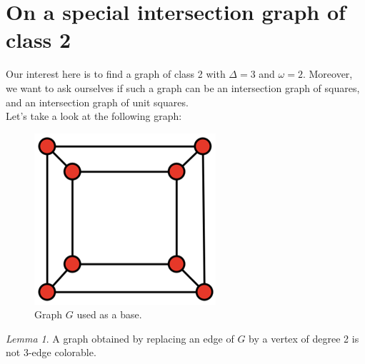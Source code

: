 \documentclass[12pt]{article}
\begin{document}
\theoremstyle{definition}
\newtheorem{definition}{Definition}[section]

\theoremstyle{remark}
\newtheorem*{remark}{Remark}
\newtheorem{theorem}{Theorem}[section]
\newtheorem{lemma}[theorem]{Lemma}

\section{On a special intersection graph of class 2}
Our interest here is to find a graph of class 2 with $\Delta = 3$ and $\omega = 2$. Moreover, we want to ask ourselves if such a graph can be an intersection graph
of squares, and an intersection graph of unit squares.\\
Let's take a look at the following graph:

\begin{figure}[h]
    \centering
    \caption{Graph $G$ used as a base.}
    \includegraphics[scale=0.5]{tex_images/8cube.png}

\end{figure}

\begin{lemma}
    A graph obtained by replacing an edge of $G$ by a vertex of degree 2 is not 3-edge colorable.
\end{lemma}
\end{document}
